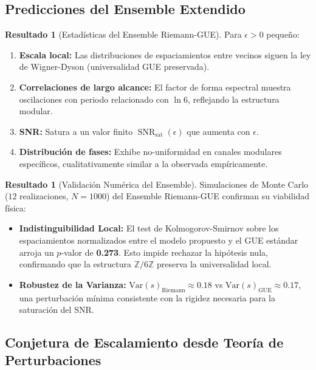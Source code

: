 \documentclass[12pt, a4paper]{article}
\theoremstyle{plain}
\theoremstyle{definition}
\newtheorem{resultado}[teorema]{Resultado}
\newcommand{\Z}{\mathbb{Z}}
\newcommand{\SNR}{\operatorname{SNR}}
\begin{document}
\subsection{Predicciones del Ensemble Extendido}

\begin{resultado}[Estadísticas del Ensemble Riemann-GUE]
Para $\epsilon > 0$ pequeño:
\begin{enumerate}
\item \textbf{Escala local:} Las distribuciones de espaciamientos entre vecinos siguen la ley de Wigner-Dyson (universalidad GUE preservada).

\item \textbf{Correlaciones de largo alcance:} El factor de forma espectral muestra oscilaciones con periodo relacionado con $\ln 6$, reflejando la estructura modular.

\item \textbf{SNR:} Satura a un valor finito $\SNR_{\text{sat}}(\epsilon)$ que aumenta con $\epsilon$.

\item \textbf{Distribución de fases:} Exhibe no-uniformidad en canales modulares específicos, cualitativamente similar a la observada empíricamente.
\end{enumerate}
\end{resultado}

\begin{resultado}[Validación Numérica del Ensemble]
Simulaciones de Monte Carlo ($12$ realizaciones, $N=1000$) del Ensemble Riemann-GUE confirman su viabilidad física:
\begin{itemize}
    \item \textbf{Indistinguibilidad Local:} El test de Kolmogorov-Smirnov sobre los espaciamientos normalizados entre el modelo propuesto y el GUE estándar arroja un $p$-valor de \textbf{0.273}. Esto impide rechazar la hipótesis nula, confirmando que la estructura $\Z/6\Z$ preserva la universalidad local.
    \item \textbf{Robustez de la Varianza:} $\text{Var}(s)_{\text{Riemann}} \approx 0.18$ vs $\text{Var}(s)_{\text{GUE}} \approx 0.17$, una perturbación mínima consistente con la rigidez necesaria para la saturación del SNR.
\end{itemize}
\end{resultado}

\subsection{Conjetura de Escalamiento desde Teoría de Perturbaciones}
\end{document}
